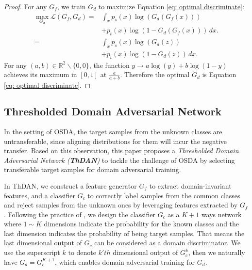 \begin{proof}
    For any $G_f$, we train $G_d$ to maximize Equation \ref{eq: optimal discriminate}:
    \begin{equation}
        \label{eq: proof optimal discriminator}
        \begin{split}
            \max_{G_d} \mathscr{L}(G_f,G_d)  = &\int_x p_s(x)\log \left(G_d\left(G_f\left(x\right)\right)\right) 
            \\ & + p_t(x) \log\left(1-G_d\left(G_f\left(x\right)\right)\right) \, dx.
            \\ = &\int_x p_s(x)\log \left(G_d\left(z\right)\right) 
            \\ & + p_t(x) \log\left(1-G_d\left(z\right)\right) \, dx.
        \end{split}
    \end{equation}
    For any $(a,b) \in \mathbb{R}^2 \backslash \{0,0\}$, the function $y \to a\log(y) + b\log(1-y)$ achieves its maximum in $[0,1]$ at $\frac{a}{a+b}$.
    Therefore the optimal $G_d$ is Equation \ref{eq: optimal discriminate}.
\end{proof}


\subsection{Thresholded Domain Adversarial Network}
In the setting of OSDA, the target samples from the unknown classes are untransferable, since aligning distributions for them will incur the negative transfer. 
Based on this observation, this paper proposes a \textit{Thresholded Domain Adversarial Network (\textbf{ThDAN})} to tackle the challenge of OSDA by selecting transferable target samples for domain adversarial training.

In ThDAN, we construct a feature generator $G_f$ to extract domain-invariant features, and a classifier $G_c$ to correctly label samples from the common classes and reject samples from the unknown ones by leveraging features extracted by $G_f$. 
Following the practice of \cite{OpensetDA-bp}, we design the classifier $G_c$ as a $K+1$ ways network where $1\sim K$ dimensions indicate the probability for the known classes and the last dimension indicates the probability of being target samples. 
That means the last dimensional output of $G_c$ can be considered as a domain discriminator.
We use the superscript $k$ to denote $k'th$ dimensional output of $G_c^k$, then we naturally have $G_d=G_c^{K+1}$, which enables domain adversarial training for $G_d$.

